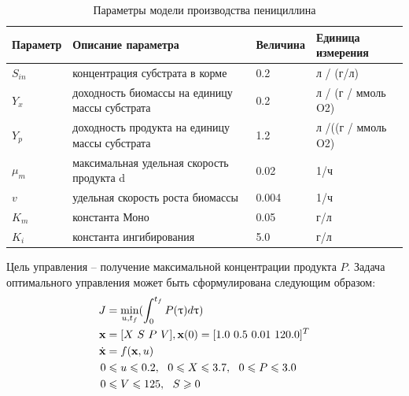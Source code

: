 \begin{table}[h!]
	\centering
	\small
	\caption{Параметры модели производства пенициллина}
	\begin{tabular}{|p{50pt}|p{190pt}|p{50pt}|p{110pt}|}
		\hline
		
		Параметр  & Описание параметра  & Величина  & Единица измерения  \\
		\hline
		$S_{in}$ & концентрация субстрата в корме & 0.2 & л / (г/л)\\
		\hline
		$Y_x$ & доходность биомассы на единицу массы субстрата & 0.2 & л / (г / ммоль O2)\\
		\hline
		$Y_p$ & доходность продукта на единицу массы субстрата & 1.2 & л /((г / ммоль O2)\\
		\hline
		$\mu_m$& максимальная удельная скорость продукта d &0.02& 1/ч\\
		\hline
		$v$& удельная скорость роста биомассы & 0.004 & 1/ч\\
		\hline
		$K_m$ & константа Моно  & 0.05 & г/л \\
		\hline
		$K_i$ & константа ингибирования  & 5.0 & г/л \\
		\hline
	\end{tabular}
	\label{table:penicilin-ch3}
\end{table}

Цель управления -- получение максимальной концентрации продукта $P$. Задача оптимального управления может быть сформулирована следующим образом:
%
\begin{equation}
\label{f:optimal_task}
\begin{split}
J &= \min_{u, t_f}(\int^{t_f}_0 P(\tau) d\tau) \\
\mathbf{x} &= [X\ S\ P \ V], \space \mathbf{x}(0) = [1.0 \ 0.5 \ 0.01 \ 120.0]^T\\
\dot{\mathbf{x}} &= f(\mathbf{x},u) \\
0 &\le u \le 0.2,\ \  0 \le X\le 3.7, \ \ 0 \le P\le 3.0 \\
0 &\le V \le 125,\ \ S \ge 0 \\
\end{split}
\end{equation}

